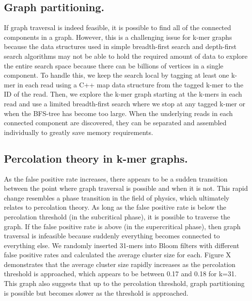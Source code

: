 \documentclass[12pt]{article} \usepackage{simplemargins}
\begin{document}
\subsection{Graph partitioning.}
If graph traversal is indeed feasible, it is possible to find all of
the connected components in a graph. However, this is a challenging
issue for k-mer graphs because the data structures used in simple
breadth-first search and depth-first search algorithms may not be able
to hold the required amount of data to explore the entire search space
because there can be billions of vertices in a single component. To
handle this, we keep the search local by tagging at least one k-mer in
each read using a C++ map data structure from the tagged k-mer to the
ID of the read. Then, we explore the k-mer graph starting at the
k-mers in each read and use a limited breadth-first search where we
stop at any tagged k-mer or when the BFS-tree has become too
large. When the underlying reads in each connected component are
discovered, they can be separated and assembled individually to
greatly save memory requirements.

\subsection{Percolation theory in k-mer graphs.}
As the false positive rate increases, there appears to be a sudden
transition between the point where graph traversal is possible and
when it is not. This rapid change resembles a phase transition in the
field of physics, which ultimately relates to percolation theory. As
long as the false positive rate is below the percolation threshold (in
the subcritical phase), it is possible to traverse the graph. If the
false positive rate is above (in the supercritical phase), then graph
traversal is infeasible because suddenly everything becomes connected to
everything else. We randomly inserted 31-mers into Bloom
filters with different false positive rates and calculated the average
cluster size for each. Figure X demonstrates that the average cluster
size rapidly increases as the percolation threshold is approached,
which appears to be between 0.17 and 0.18 for k=31. This graph also
suggests that up to the percolation threshold, graph partitioning is
possible but becomes slower as the threshold is approached.
\end{document}
